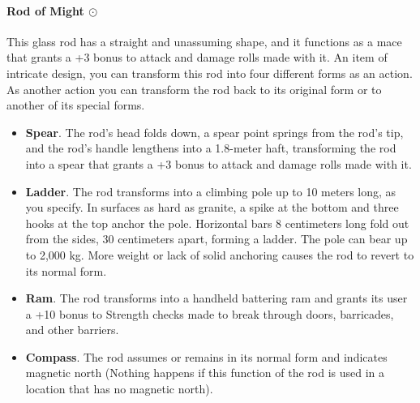     \paragraph{Rod of Might $\odot$}
        This glass rod has a straight and unassuming shape, and it functions as a mace that grants a +3 bonus to attack and damage rolls made with it.
        An item of intricate design, you can transform this rod into four different forms as an action.
        As another action you can transform the rod back to its original form or to another of its special forms.
        \begin{itemize}
            \item \textbf{Spear}.
            The rod's head folds down, a spear point springs from the rod's tip, and the rod's handle lengthens into a 1.8-meter haft, transforming the rod into a spear that grants a +3 bonus to attack and damage rolls made with it.
            \item \textbf{Ladder}.
            The rod transforms into a climbing pole up to 10 meters long, as you specify.
            In surfaces as hard as granite, a spike at the bottom and three hooks at the top anchor the pole.
            Horizontal bars 8 centimeters long fold out from the sides, 30 centimeters apart, forming a ladder.
            The pole can bear up to 2,000 kg.
            More weight or lack of solid anchoring causes the rod to revert to its normal form.
            \item \textbf{Ram}.
            The rod transforms into a handheld battering ram and grants its user a +10 bonus to Strength checks made to break through doors, barricades, and other barriers.
            \item \textbf{Compass}.
            The rod assumes or remains in its normal form and indicates magnetic north (Nothing happens if this function of the rod is used in a location that has no magnetic north).
        \end{itemize}

